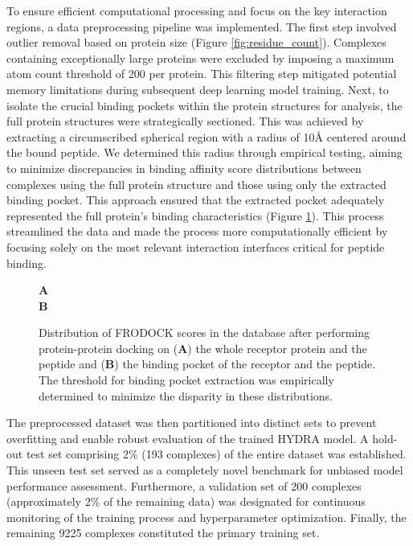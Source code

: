 To ensure efficient computational processing and focus on the key interaction regions, a data preprocessing pipeline was implemented. The first step involved outlier removal based on protein size (Figure \ref{fig:residue_count}). Complexes containing exceptionally large proteins were excluded by imposing a maximum atom count threshold of 200 per protein. This filtering step mitigated potential memory limitations during subsequent deep learning model training. Next, to isolate the crucial binding pockets within the protein structures for analysis, the full protein structures were strategically sectioned. This was achieved by extracting a circumscribed spherical region with a radius of 10Å centered around the bound peptide. 
We determined this radius through empirical testing, aiming to minimize discrepancies in binding affinity score distributions between complexes using the full protein structure and those using only the extracted binding pocket. This approach ensured that the extracted pocket adequately represented the full protein's binding characteristics (Figure \ref{fig:pocket_protein_min}). This process streamlined the data and made the process more computationally efficient by focusing solely on the most relevant interaction interfaces critical for peptide binding. \\

\begin{figure}
  \center

  \textbf{\Large A}
   \\

  \textbf{\Large B}

  \caption{Distribution of FRODOCK scores in the database after performing protein-protein docking on (\textbf{A}) the whole receptor protein and the peptide and (\textbf{B}) the binding pocket of the receptor and the peptide. The threshold for binding pocket extraction was empirically determined to minimize the disparity in these distributions.}

  \label{fig:pocket_protein_min}
\end{figure}

The preprocessed dataset was then partitioned into distinct sets to prevent overfitting and enable robust evaluation of the trained HYDRA model. A hold-out test set comprising 2\% (193 complexes) of the entire dataset was established. This unseen test set served as a completely novel benchmark for unbiased model performance assessment. Furthermore, a validation set of 200 complexes (approximately 2\% of the remaining data) was designated for continuous monitoring of the training process and hyperparameter optimization. Finally, the remaining 9225 complexes constituted the primary training set. \\

